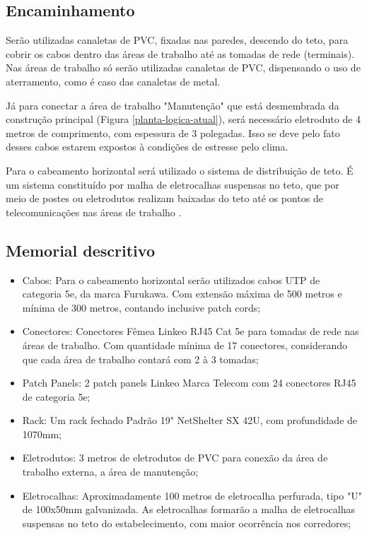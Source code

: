 \documentclass[	DIV=calc,%
							paper=a4,%
							fontsize=12pt,%
							onecolumn]{scrartcl}	 					%
\begin{document}
\subsection{Encaminhamento}

Serão utilizadas canaletas de PVC, fixadas nas paredes, descendo do teto, para cobrir os cabos dentro das áreas de trabalho até as tomadas de rede (terminais). Nas áreas de trabalho só serão utilizadas canaletas de PVC, dispensando o uso de aterramento, como é caso das canaletas de metal.

Já para conectar a área de trabalho "Manutenção" que está desmembrada da construção principal (Figura \ref{planta-logica-atual}), será necessário eletroduto de 4 metros de comprimento, com espessura de 3 polegadas. Isso se deve pelo fato desses cabos estarem expostos à condições de estresse pelo clima.

Para o cabeamento horizontal será utilizado o sistema de distribuição de teto. É um sistema constituído por malha de eletrocalhas suspensas no teto, que por meio de postes ou eletrodutos realizam baixadas do teto até os pontos de telecomunicações nas áreas de trabalho \cite{senai2012}.\newpage


\subsection{Memorial descritivo}

\begin{itemize}
	\item Cabos: Para o cabeamento horizontal serão utilizados cabos UTP de categoria 5e, da marca Furukawa. Com extensão máxima de 500 metros e mínima de 300 metros, contando inclusive patch cords;
	\item Conectores: Conectores Fêmea Linkeo RJ45 Cat 5e para tomadas de rede nas áreas de trabalho. Com quantidade mínima de 17 conectores, considerando que cada área de trabalho contará com 2 à 3 tomadas;
	\item Patch Panels: 2 patch panels Linkeo Marca Telecom com 24 conectores RJ45 de categoria 5e;
	\item Rack: Um rack fechado Padrão 19" NetShelter SX 42U, com  profundidade de 1070mm;
	\item Eletrodutos: 3 metros de eletrodutos de PVC para conexão da área de trabalho externa, a área de manutenção; 
	\item Eletrocalhas: Aproximadamente 100 metros de eletrocalha perfurada, tipo "U" de 100x50mm galvanizada. As eletrocalhas formarão a  malha de eletrocalhas suspensas no teto do estabelecimento, com maior ocorrência nos corredores;
\end{itemize}\newpage
\end{document}
